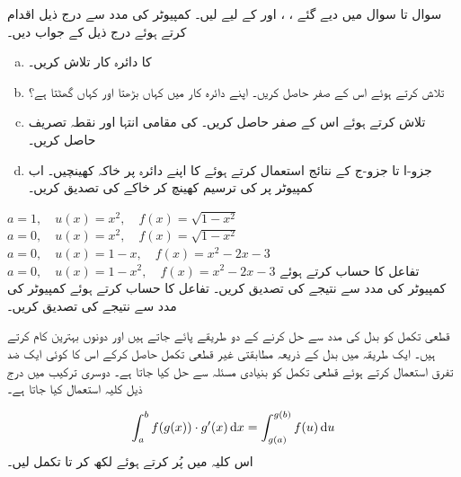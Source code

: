 سوال  تا سوال  میں دیے گئے ، ،  اور  کے لیے  لیں۔ کمپیوٹر کی مدد سے درج ذیل اقدام کرتے ہوئے درج ذیل کے جواب دیں۔
\begin{enumerate}[a.]
\item
{} کا دائرہ کار تلاش کریں۔
\item
{} تلاش کرتے ہوئے اس کے صفر حاصل کریں۔ اپنے دائرہ کار میں کہاں  بڑھتا اور کہاں گھٹتا ہے؟
\item
{} تلاش کرتے ہوئے اس کے صفر حاصل کریں۔ کی  مقامی انتہا اور نقطہ تصریف حاصل کریں۔
\item
جزو-ا تا جزو-ج کے نتائج استعمال کرتے ہوئے  کا اپنے دائرہ پر خاکہ کھینچیں۔ اب کمپیوٹر پر  کی ترسیم کھینچ کر  خاکے کی تصدیق کریں۔
\end{enumerate}
$a=1,\quad u(x)=x^2,\quad f(x)=\sqrt{1-x^2}$
$a=0,\quad u(x)=x^2,\quad f(x)=\sqrt{1-x^2}$
$a=0,\quad u(x)=1-x,\quad f(x)=x^2-2x-3$
$a=0,\quad u(x)=1-x^2,\quad f(x)=x^2-2x-3$
تفاعل  کا حساب کرتے ہوئے کمپیوٹر کی مدد سے نتیجے کی تصدیق کریں۔
تفاعل  کا حساب کرتے ہوئے کمپیوٹر کی مدد سے نتیجے کی تصدیق کریں۔



قطعی تکمل کو بدل کی مدد سے حل کرنے کے دو طریقے پائے جاتے ہیں اور دونوں بہترین کام کرتے ہیں۔ ایک طریقہ میں بدل کے ذریعہ مطابقتی غیر قطعی تکمل حاصل کرکے  اس کا کوئی ایک ضد تفرق استعمال کرتے ہوئے قطعی تکمل کو بنیادی مسئلہ سے حل کیا جاتا ہے۔ دوسری ترکیب میں درج ذیل کلیہ استعمال کیا جاتا ہے۔

\begin{align}\label{مساوات_تکمل_کلیہ_بدل}
\int_a^bf(g(x))\cdot g'(x)\dif x=\int_{g(a)}^{g(b)}f(u)\dif u
\end{align}
اس کلیہ میں  پُر کرتے ہوئے  لکھ کر  تا  تکمل لیں۔


